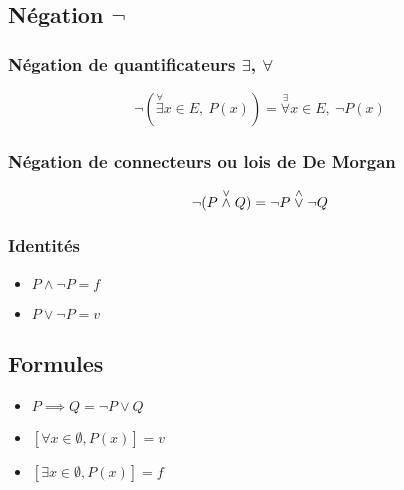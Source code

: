 \documentclass{article}
\begin{document}
\subsection{Négation $\lnot$}

\newcommand{\forallexists}{\stackrel{\forall}{\exists}}
\newcommand{\existsforall}{\stackrel{\exists}{\forall}}

\subsubsection{Négation de quantificateurs $\exists$, $\forall$}

\[
	\lnot(\forallexists x \in E,\ P(x)) = \existsforall x \in E,\ \lnot P(x)
\] 


\subsubsection{Négation de connecteurs ou lois de De Morgan}

\[
	\lnot(P \stackrel{\lor}{\land} Q) = \lnot P \stackrel{\land}{\lor} \lnot Q
\] 

\subsubsection{Identités}
\begin{itemize}
	\item $P \land \lnot P = f$
	\item $P \lor \lnot P = v$
\end{itemize}

\subsection{Formules}

\begin{itemize}
	\item $P \implies Q = \lnot P \lor Q$
	\item $[\forall x \in \emptyset, P(x)] = v$
	\item $[\exists x \in \emptyset, P(x)] = f$
\end{itemize}
\end{document}
